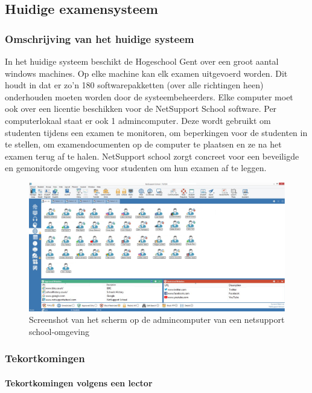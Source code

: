 \subsection{Huidige examensysteem}

\subsubsection{Omschrijving van het huidige systeem}
In het huidige systeem beschikt de Hogeschool Gent over een groot aantal windows machines. Op elke machine kan elk examen uitgevoerd worden. Dit houdt in dat er zo'n 180 softwarepakketten (over alle richtingen heen) onderhouden moeten worden door de systeembeheerders. Elke computer moet ook over een licentie beschikken voor de NetSupport School software. Per computerlokaal staat er ook 1 admincomputer. Deze wordt gebruikt om studenten tijdens een examen te monitoren, om beperkingen voor de studenten in te stellen, om examendocumenten op de computer te plaatsen en ze na het examen terug af te halen. NetSupport school zorgt concreet voor een beveiligde en gemonitorde omgeving voor studenten om hun examen af te leggen. 



\begin{figure}
\includegraphics[width=\linewidth]{img/NetsupportAdmin.png}
	\caption{Screenshot van het scherm op de admincomputer van een netsupport school-omgeving \autocite{NetSup2019}}
	
\label{fig:NetSupport1}
\end{figure}


\subsubsection{Tekortkomingen}


\paragraph{Tekortkomingen volgens een lector}

